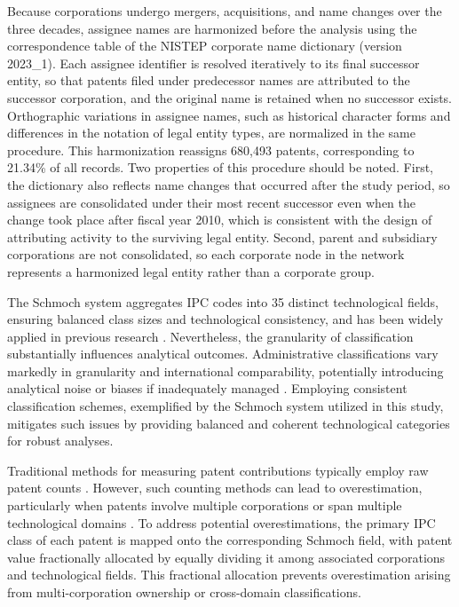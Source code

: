 \documentclass[lineno,pdflatex,sn-mathphys-num]{sn-jnl}%
\theoremstyle{thmstyleone}%
\theoremstyle{thmstyletwo}%
\theoremstyle{thmstylethree}%
\begin{document}
Because corporations undergo mergers, acquisitions, and name changes over the three decades, assignee names are harmonized before the analysis using the correspondence table of the NISTEP corporate name dictionary (version 2023\_1).
Each assignee identifier is resolved iteratively to its final successor entity, so that patents filed under predecessor names are attributed to the successor corporation, and the original name is retained when no successor exists.
Orthographic variations in assignee names, such as historical character forms and differences in the notation of legal entity types, are normalized in the same procedure.
This harmonization reassigns 680,493 patents, corresponding to 21.34\% of all records.
Two properties of this procedure should be noted.
First, the dictionary also reflects name changes that occurred after the study period, so assignees are consolidated under their most recent successor even when the change took place after fiscal year 2010, which is consistent with the design of attributing activity to the surviving legal entity.
Second, parent and subsidiary corporations are not consolidated, so each corporate node in the network represents a harmonized legal entity rather than a corporate group.

The Schmoch system aggregates IPC codes into 35 distinct technological fields, ensuring balanced class sizes and technological consistency, and has been widely applied in previous research \cite{PintarScherngell2022,Balland2018,Whittle2019}. Nevertheless, the granularity of classification substantially influences analytical outcomes. Administrative classifications vary markedly in granularity and international comparability, potentially introducing analytical noise or biases if inadequately managed \cite{Hidalgo2021}. Employing consistent classification schemes, exemplified by the Schmoch system utilized in this study, mitigates such issues by providing balanced and coherent technological categories for robust analyses.

Traditional methods for measuring patent contributions typically employ raw patent counts \cite{balland2017tci,Balland2018,PintarScherngell2022,Pinheiro2022,Whittle2019,Jun2023,Abay2024}. However, such counting methods can lead to overestimation, particularly when patents involve multiple corporations or span multiple technological domains \cite{PintarScherngell2022}. To address potential overestimations, the primary IPC class of each patent is mapped onto the corresponding Schmoch field, with patent value fractionally allocated by equally dividing it among associated corporations and technological fields. This fractional allocation prevents overestimation arising from multi-corporation ownership or cross-domain classifications.
\end{document}

